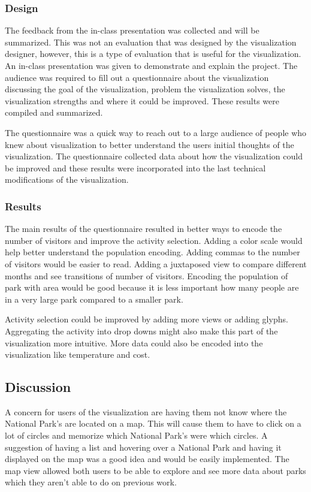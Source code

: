 \subsubsection{Design}
The feedback from the in-class presentation was collected and will be summarized. This was not an evaluation that was designed by the visualization designer, however, this is a type of evaluation that is useful for the visualization. An in-class presentation was given to demonstrate and explain the project. The audience was required to fill out a questionnaire about the visualization discussing the goal of the visualization, problem the visualization solves, the visualization strengths and where it could be improved. These results were compiled and summarized. 

The questionnaire was a quick way to reach out to a large audience of people who knew about visualization to better understand the users initial thoughts of the visualization. The questionnaire collected data about how the visualization could be improved and these results were incorporated into the last technical modifications of the visualization.

\subsubsection{Results}

The main results of the questionnaire resulted in better ways to encode the number of visitors and improve the activity selection. Adding a color scale would help better understand the population encoding. Adding commas to the number of visitors would be easier to read. Adding a juxtaposed view to compare different months and see transitions of number of visitors. Encoding the population of park with area would be good because it is less important how many people are in a very large park compared to a smaller park.

Activity selection could be improved by adding more views or adding glyphs. Aggregating the activity into drop downs might also make this part of the visualization more intuitive. More data could also be encoded into the visualization like temperature and cost. 


\subsection{Discussion}
 A concern for users of the visualization are having them not know where the National Park's are located on a map. This will cause them to have to click on a lot of circles and memorize which National Park's were which circles. A suggestion of having a list and hovering over a National Park and having it displayed on the map was a good idea and would be easily implemented. The map view allowed both users to be able to explore and see more data about parks which they aren't able to do on previous work. 

